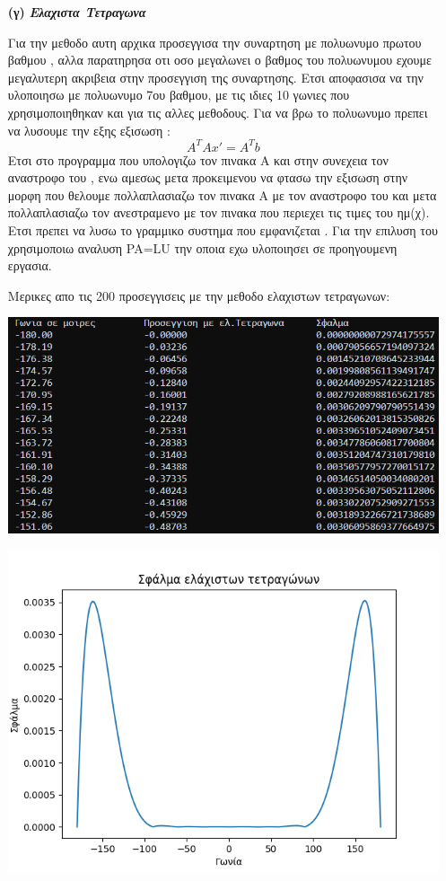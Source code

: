 \documentclass[a4paper,11pt]{article}
\begin{document}
\begin{enumerate}
		\item[\textbf{(γ)}] \emph {\textbf{Ελαχιστα Τετραγωνα}}
		\begin{center}
			Για την μεθοδο αυτη αρχικα προσεγγισα την συναρτηση με πολυωνυμο πρωτου βαθμου , αλλα παρατηρησα οτι οσο μεγαλωνει ο βαθμος του πολυωνυμου εχουμε μεγαλυτερη ακριβεια στην προσεγγιση της συναρτησης. Ετσι αποφασισα να την υλοποιησω με πολυωνυμο 7ου βαθμου, με τις ιδιες 10 γωνιες που χρησιμοποιηθηκαν και για τις αλλες μεθοδους. Για να βρω το πολυωνυμο πρεπει να λυσουμε την εξης εξισωση : $$Α^{Τ}Αx' = A^{T}b$$   Ετσι στο προγραμμα που υπολογιζω τον πινακα Α και στην συνεχεια τον αναστροφο του , ενω αμεσως μετα προκειμενου να φτασω την εξισωση στην μορφη που θελουμε πολλαπλασιαζω τον πινακα Α με τον αναστροφο του και μετα πολλαπλασιαζω τον ανεστραμενο με τον πινακα που περιεχει τις τιμες του ημ(χ). Ετσι πρεπει να λυσω το γραμμικο συστημα που εμφανιζεται . Για την επιλυση του χρησιμοποιω αναλυση PA=LU την οποια εχω υλοποιησει σε προηγουμενη εργασια. 
		\end{center}
		\begin{center}
			Μερικες απο τις 200 προσεγγισεις με την μεθοδο ελαχιστων τετραγωνων: 
		\end{center}
		\begin{center}
			\emph{\includegraphics[scale=0.75]{leastSquares.png}}
		\end{center}
		\begin{center}
			\emph{\includegraphics[scale=0.75]{leastSquaresError.png}}

\end{center}
\end{enumerate}
\end{document}
